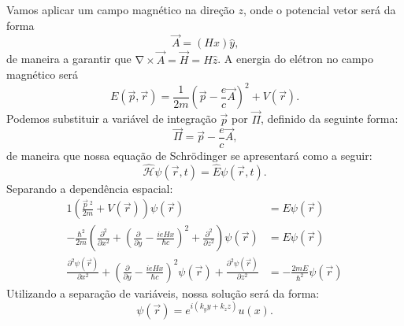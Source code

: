 \documentclass{article}
\newcommand{\curl}{\mathrm{\nabla \times}}
\begin{document}
Vamos aplicar um campo magnético na direção $z$, onde o potencial vetor será da forma
\begin{equation}
 \vec{A} = (Hx) \hat{y}\text{,}
\end{equation}
de maneira a garantir que $\curl \vec{A} = \vec{H} = H\hat{z}$. A energia do elétron no campo magnético será
\begin{equation}
 E(\vec{p},\vec{r}) = \frac{1}{2m} \left( \vec{p} - \frac{e}{c}\vec{A}\right) ^{2} + V(\vec{r})\text{.}
\end{equation}
Podemos substituir a variável de integração $\vec{p}$ por $\vec{\Pi}$, definido da seguinte forma:
\begin{equation}
 \vec{\Pi} = \vec{p} - \frac{e}{c}\vec{A}\text{,}
\end{equation}
de maneira que nossa equação de Schrödinger se apresentará como a seguir:
\begin{equation}
 \hat{\mathcal{H}} \psi(\vec{r},t) = \hat{E}\psi(\vec{r},t)\text{.}
\end{equation}
Separando a dependência espacial:
\begin{alignat}{1}
 \left( \frac{\vec{p}\ ^{2}}{2m} + V(\vec{r}) \right) \psi(\vec{r}) &= E\psi(\vec{r}) \\
 -\frac{\hbar^2}{2m}\left( \frac{\partial^2}{\partial x^2} + \left( \frac{\partial}{\partial y} - \frac{i e H x}{\hbar c} \right)^{2}
  + \frac{\partial^2}{\partial z^2}\right) \psi(\vec{r}) &= E\psi(\vec{r}) \\
 \frac{\partial^2\psi(\vec{r})}{\partial x^2} + \left( \frac{\partial}{\partial y} - \frac{i e H x}{\hbar c} \right)^{2}\psi(\vec{r})
  + \frac{\partial^2 \psi(\vec{r})}{\partial z^2} &= -\frac{2 m E}{\hbar^{2}}\psi(\vec{r})
\end{alignat}
Utilizando a separação de variáveis, nossa solução será da forma:
\begin{equation}
 \psi(\vec{r}) = e^{i(k_y y + k_z z)} u(x) \text{.}
\end{equation}
% 
% 
% 
\end{document}
